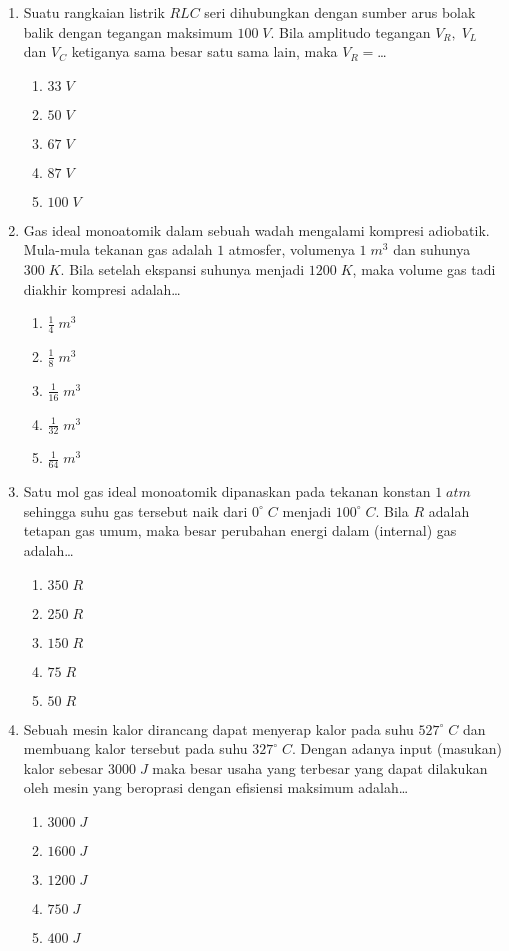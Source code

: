 \documentclass[A4,12PT, english, twocolumn]{journal}
\begin{document}
\begin{enumerate}
\item Suatu rangkaian listrik $RLC$ seri dihubungkan dengan sumber arus bolak balik dengan tegangan maksimum $100 \; V$. Bila amplitudo tegangan $V_R, \; V_L$ dan $V_C$ ketiganya sama besar satu sama lain, maka $V_R=$\dots
    \begin{enumerate}
        \item $33 \; V$
        \item $50 \; V$
        \item $67 \; V$
        \item $87 \; V$
        \item $100 \; V$
    \end{enumerate}
    
\item Gas ideal monoatomik dalam sebuah wadah mengalami kompresi adiobatik. Mula-mula tekanan gas adalah $1$ atmosfer, volumenya $1 \; m^3$ dan suhunya $300 \; K$. Bila setelah ekspansi suhunya menjadi $1200 \; K$, maka volume gas tadi diakhir kompresi adalah\dots
    \begin{enumerate}
        \item $\frac{1}{4} \; m^3$
        \item $\frac{1}{8} \; m^3$
        \item $\frac{1}{16} \; m^3$
        \item $\frac{1}{32} \; m^3$
        \item $\frac{1}{64} \; m^3$
    \end{enumerate}

\item Satu mol gas ideal monoatomik dipanaskan pada tekanan konstan $1 \; atm$ sehingga suhu gas tersebut naik dari $0^\circ \; C$ menjadi $100^\circ \; C$. Bila $R$ adalah tetapan gas umum, maka besar perubahan energi dalam (internal) gas adalah\dots
    \begin{enumerate}
        \item $350 \; R$
        \item $250 \; R$
        \item $150 \; R$
        \item $75 \; R$
        \item $50 \; R$
    \end{enumerate}

\item Sebuah mesin kalor dirancang dapat menyerap kalor pada suhu $527^\circ \; C$ dan membuang kalor tersebut pada suhu $327^\circ \; C$. Dengan adanya input (masukan) kalor sebesar $3000 \; J$ maka besar usaha yang terbesar yang dapat dilakukan oleh mesin yang beroprasi dengan efisiensi maksimum adalah\dots
    \begin{enumerate}
        \item $3000 \; J$
        \item $1600 \; J$
        \item $1200 \; J$
        \item $750 \; J$
        \item $400 \; J$
    \end{enumerate}
 

\end{enumerate}
\end{document}

